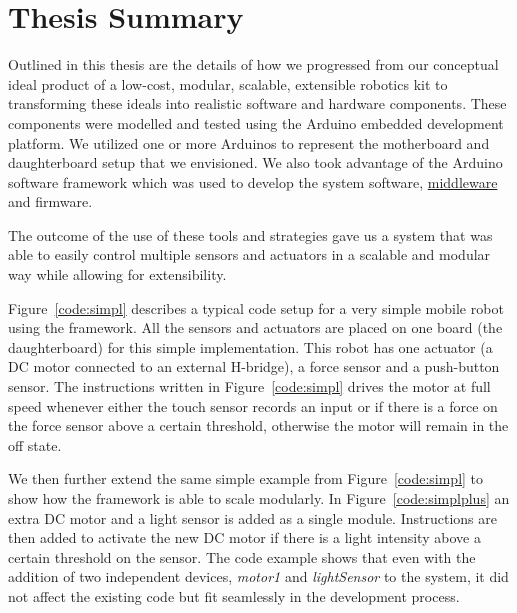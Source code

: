 \section{Thesis Summary}
Outlined in this thesis are the details of how we progressed from our conceptual ideal product of a low-cost, modular, scalable, extensible robotics kit to transforming these ideals into realistic software and hardware components. These components were modelled and tested using the Arduino embedded development platform. We utilized one or more Arduinos to represent the motherboard and daughterboard setup that we envisioned. We also took advantage of the Arduino software framework which was used to develop the system software, \hyperref[ssub:middleware]{middleware} and firmware.

The outcome of the use of these tools and strategies gave us a system that was able to easily control multiple sensors and actuators in a scalable and modular way while allowing for extensibility.

Figure~\ref{code:simpl} describes a typical code setup for a very simple mobile robot using the \xten framework. All the sensors and actuators are placed on one board (the daughterboard) for this simple implementation. This robot has one actuator (a DC motor connected to an external H-bridge), a force sensor and a push-button sensor. The instructions written in Figure~\ref{code:simpl} drives the motor at full speed whenever either the touch sensor records an input or if there is a force on the force sensor above a certain threshold, otherwise the motor will remain in the off state.

 We then further extend the same simple example from Figure~\ref{code:simpl} to show how the \xten framework is able to scale modularly.
 In Figure~\ref{code:simplplus} an extra DC motor and a light sensor is added as a single module. Instructions are then added to activate the new DC motor if there is a light intensity above a certain threshold on the sensor. The code example shows that even with the addition of two independent devices, \emph{motor1} and \emph{lightSensor} to the system, it did not affect the existing code but fit seamlessly in the development process.
 

